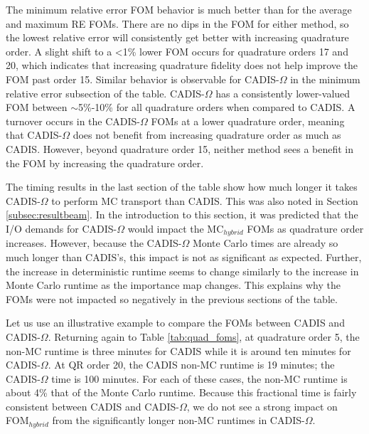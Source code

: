 The minimum relative error FOM behavior is
much better than for the average and maximum RE FOMs. 
There are no dips in the FOM for either method,
so the lowest relative error will
consistently get better with increasing quadrature order. A slight shift
to a <1\% lower FOM
occurs for quadrature orders 17 and 20, which indicates that increasing
quadrature fidelity does not help improve the FOM past order 15. Similar
behavior is observable for CADIS-$\Omega$ in the minimum relative error
subsection of the table. CADIS-$\Omega$ has a consistently lower-valued FOM
between $\sim$5\%-10\% for all quadrature orders when compared to CADIS.
A turnover occurs in the CADIS-$\Omega$
FOMs at a lower quadrature order, meaning that CADIS-$\Omega$ does not benefit
from increasing quadrature order as much as CADIS.
However, beyond quadrature order 15, neither method sees a benefit in the FOM by
increasing the quadrature order.

The timing results in the last section of the table show how much longer it
takes CADIS-$\Omega$ to perform MC transport than CADIS. 
This was
also noted in Section \ref{subsec:resultbeam}. In the
introduction to this section, it was predicted that the I/O demands for
CADIS-$\Omega$ would impact the MC$_{hybrid}$ FOMs as quadrature order
increases. However, because the CADIS-$\Omega$ Monte Carlo times are already so
much longer than CADIS's, this impact is not as significant as expected. Further,
the increase in deterministic runtime seems to change similarly to the increase
in Monte Carlo runtime as the importance map changes. This explains why the FOMs
were not impacted so negatively in the previous sections of the table.

Let us use an illustrative example to compare the FOMs between CADIS and
CADIS-$\Omega$. Returning again to Table
\ref{tab:quad_foms}, at quadrature order 5, the non-MC runtime is three minutes for
CADIS while it is around ten minutes for CADIS-$\Omega$. At QR order 20, the
CADIS non-MC runtime is 19 minutes; the CADIS-$\Omega$ time is 100 minutes. For
each of these cases, the non-MC runtime is about 4\% that of the Monte Carlo runtime.
Because this fractional time is fairly consistent between CADIS and
CADIS-$\Omega$, we do not see a strong impact on FOM$_{hybrid}$ from the
significantly longer non-MC runtimes in CADIS-$\Omega$.

